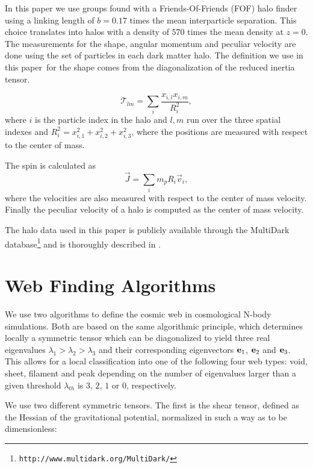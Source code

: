 \documentclass[useAMS,usenatbib]{mn2e}
\newcommand{\documentname}{paper~}
\begin{document}
In this paper we use groups found with a Friends-Of-Friends (FOF) halo
finder using a linking length of $b=0.17$ times the mean interparticle
separation. This choice translates into halos with a density of $570$
times the mean density at $z=0$. The measurements for the shape,
angular momentum and peculiar velocity are done using the set of
particles in each dark matter halo. The definition we use in this
\documentname for the shape comes from the diagonalization of the
reduced inertia tensor.

\begin{equation}
{\mathcal T}_{lm} = \sum_{i}\frac{x_{i,l}x_{i,m}}{R_i^2}, 
\end{equation}
where $i$ is the particle index in the halo and $l,m$ run over the
three spatial indexes  and $R_i^2 = x_{i,1}^2 + x_{i,2}^2 +
x_{i,3}^2$, where the positions are measured with respect to the
center of mass.

The spin is calculated as
\begin{equation}
\vec{J} = \sum_{i}m_p{R_i}\vec{v}_i, 
\end{equation}
where the velocities are also measured with respect to the center of
mass velocity. Finally the peculiar velocity of a halo is computed as
the center of mass velocity.

The halo data used in this paper is publicly available through the
MultiDark
database\footnote{\texttt{http://www.multidark.org/MultiDark/}} and is
thoroughly described in \cite{2013AN....334..691R}. 



\section{Web Finding Algorithms}
\label{sec:algorithms}

We use two algorithms to define the cosmic web in cosmological N-body
simulations. Both are based on the same algorithmic principle, which
determines locally a symmetric tensor which can be diagonalized to yield
three real eigenvalues $\lambda_1>\lambda_2>\lambda_3$ and their
corresponding eigenvectors ${\bf e}_{1}$, ${\bf e}_2$ and ${\bf
  e}_3$. This allows for a local classification into one of the
following four web types: void, sheet, filament and peak depending
on the number of eigenvalues larger than a given threshold
$\lambda_{th}$ is $3$, $2$, $1$ or $0$, respectively.

We use two different symmetric tensors. The first is the shear tensor,
defined as the Hessian of the gravitational potential, normalized in
such a way as to be dimensionless:
\end{document}
